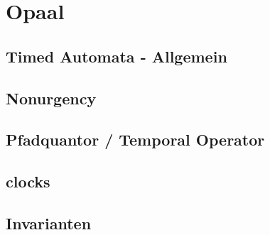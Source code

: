 \section{Opaal}

\subsection{Timed Automata - Allgemein}

\subsection{Nonurgency}

\subsection{Pfadquantor / Temporal Operator}

\subsection{clocks}

\subsection{Invarianten}

